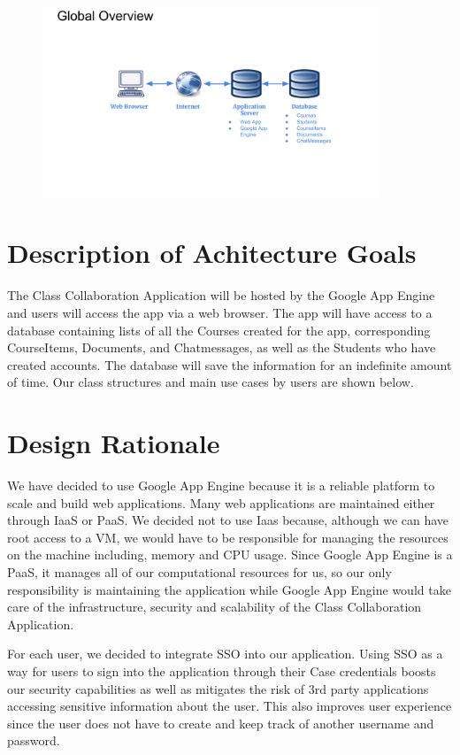 \documentclass[16pt]{scrreprt}
\begin{document}
\begin{figure}[ht]
  \centering
  \includegraphics[page=3,width=0.9\textwidth]{diagrams/SDD_Diagrams.pdf}
  \label{fig:SDD_1}
\end{figure}

\section{Description of Achitecture Goals}
The Class Collaboration Application will be hosted by the Google App Engine and users will access the app via a web browser. The app will have access to a database containing lists of all the Courses created for the app, corresponding CourseItems, Documents, and Chatmessages, as well as the Students who have created accounts. The database will save the information for an indefinite amount of time. Our class structures and main use cases by users are shown below. 

\section{Design Rationale}
\hspace{10mm}We have decided to use Google App Engine because it is a reliable platform to scale and build web applications. Many web applications are maintained either through IaaS or PaaS. We decided not to use Iaas because, although we can have root access to a VM, we would have to be responsible for managing the resources on the machine including, memory and CPU usage. Since Google App Engine is a PaaS, it manages all of our computational resources for us, so our only responsibility is maintaining the application while Google App Engine would take care of the infrastructure, security and scalability of the Class Collaboration Application. 

\hspace{10mm}For each user, we decided to integrate SSO into our application. Using SSO as a way for users to sign into the application through their Case credentials boosts our security capabilities as well as mitigates the risk of 3rd party applications accessing sensitive information about the user. This also improves user experience since the user does not have to create and keep track of another username and password. 
\end{document}
